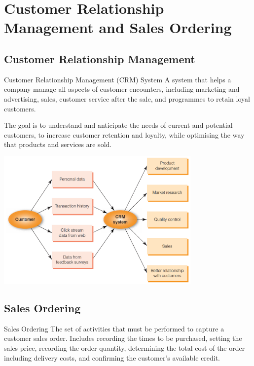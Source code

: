 \documentclass[\main/notes.tex]{subfiles}
\begin{document}
		\section[Customer Relationship Management]{Customer Relationship Management and Sales Ordering}
			\subsection{Customer Relationship Management}
				\begin{definition}{Customer Relationship Management (CRM) System}
					A system that helps a company manage all aspects of customer encounters, including marketing and advertising, sales, customer service after the sale, and programmes to retain loyal customers.

					The goal is to understand and anticipate the needs of current and potential customers, to increase customer retention and loyalty, while optimising the way that products and services are sold.
					\begin{center}
						\includegraphics[width=0.75\textwidth]{chapter07/customer_relationship.png}
					\end{center}
				\end{definition}
			\subsection{Sales Ordering}
				\begin{definition}{Sales Ordering}
					The set of activities that must be performed to capture a customer sales order. Includes recording the times to be purchased, setting the sales price, recording the order quantity, determining the total cost of the order including delivery costs, and confirming the customer's available credit.
				\end{definition}
\end{document}
